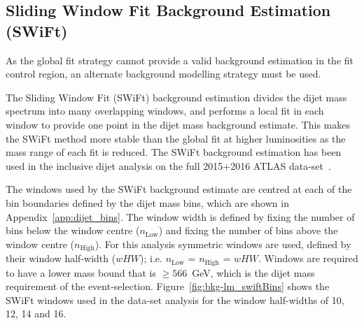 
\newpage
\subsection{Sliding Window Fit Background Estimation (SWiFt)}\label{sec:bkg-full_swift}

As the global fit strategy cannot provide a valid background estimation in the
\lm{} fit control region, an alternate background modelling strategy must be used.

The Sliding Window Fit (SWiFt) background estimation divides the dijet mass spectrum into many overlapping windows,
and performs a local fit in each window to provide one point in the dijet mass background estimate.
This makes the SWiFt method more stable than the global fit at higher luminosities as the mass range of each fit is reduced.
The SWiFt background estimation has been used in the inclusive dijet analysis on the full 2015+2016 ATLAS data-set~\cite{dijet-mori17_paper}.

The windows used by the SWiFt background estimate are centred at each of the
bin boundaries defined by the dijet mass bins, which are shown in Appendix~\ref{app:dijet_bins}.
The window width is defined by fixing the number of bins below the window centre ($n_{\text{Low}}$)
and fixing the number of bins above the window centre ($n_{\text{High}}$).
For this analysis symmetric windows are used, defined by their window half-width ($wHW$); i.e. $n_{\text{Low}}$ = $n_{\text{High}}$ = $wHW$.
Windows are required to have a lower mass bound that is $\geq566$~GeV, which is the dijet mass requirement of the event-selection.
Figure~\ref{fig:bkg-lm_swiftBins} shows the SWiFt windows used in the \lm{} data-set analysis for the window half-widths of 10, 12, 14 and 16.

